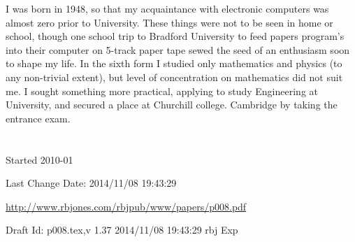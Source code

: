 \documentclass[10pt,titlepage]{book}
\begin{document}
I was born in 1948, so that my acquaintance with electronic computers was almost zero prior to University.
These things were not to be seen in home or school, though one school trip to Bradford University to feed papers program's into their computer on 5-track paper tape sewed the seed of an enthusiasm soon to shape my life.
In the sixth form I studied only mathematics and physics (to any non-trivial extent), but level of concentration on mathematics did not suit me.
I sought something more practical, applying to study Engineering at University, and secured a place at Churchill college. Cambridge by taking the entrance exam.



\chapter{}

\backmatter

%




\label{index}
{\twocolumn[]
{\small\printindex}}

\vfill

\tiny{
Started 2010-01

Last Change $ $Date: 2014/11/08 19:43:29 $ $

\href{http://www.rbjones.com/rbjpub/www/papers/p008.pdf}{http://www.rbjones.com/rbjpub/www/papers/p008.pdf}

Draft $ $Id: p008.tex,v 1.37 2014/11/08 19:43:29 rbj Exp $ $
}%
\end{document}

